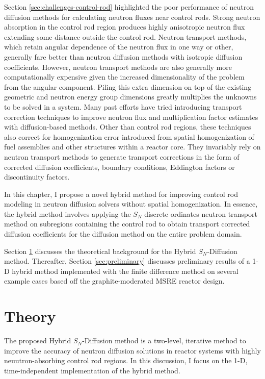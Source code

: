 Section \ref{sec:challenges-control-rod} highlighted the poor performance of neutron diffusion
methods for calculating neutron fluxes near control rods. Strong neutron absorption in the control
rod region produces highly anisotropic neutron flux extending some distance outside the control
rod. Neutron transport methods, which retain angular dependence of the neutron flux in one way or
other, generally fare better than neutron diffusion methods with isotropic diffusion coefficients.
However, neutron transport methods are also generally more computationally expensive given the
increased dimensionality of the problem from the angular component. Piling this extra dimension on
top of the existing geometric and neutron energy group dimensions greatly multiplies the unknowns
to be solved in a system. Many past efforts have tried introducing transport correction techniques
to improve neutron flux and multiplication factor estimates with diffusion-based methods. Other
than control rod regions, these techniques also correct for homogenization error introduced from
spatial homogenization of fuel assemblies and other structures within a reactor core. They
invariably rely on neutron transport methods to generate transport corrections in the form of
corrected diffusion coefficients, boundary conditions, Eddington factors or discontinuity factors.

In this chapter, I propose a novel hybrid method for improving control rod modeling in neutron
diffusion solvers without spatial homogenization. In essence, the hybrid method involves applying
the $S_N$ discrete ordinates neutron transport method on subregions containing the control rod to
obtain transport corrected diffusion coefficients for the diffusion method on the entire problem
domain. 

Section \ref{sec:hybrid-theory} discusses the theoretical background for the Hybrid $S_N$-Diffusion
method. Thereafter, Section \ref{sec:preliminary} discusses preliminary results of a 1-D hybrid
method implemented with the finite difference method on several example cases based off the
graphite-moderated \gls{MSRE} reactor design.

\section{Theory} \label{sec:hybrid-theory}

The proposed Hybrid $S_N$-Diffusion method is a two-level, iterative method to improve the
accuracy of neutron diffusion solutions in reactor systems with highly neuutron-absorbing control
rod regions. In this discussion, I focus on the 1-D, time-independent implementation of the
hybrid method.

